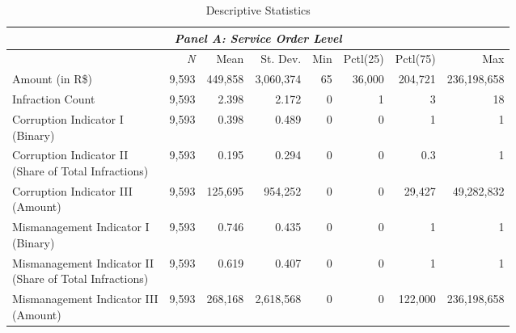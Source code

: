 
\begin{table}[!htbp]
  \caption{\label{tab:descriptivestatistics}Descriptive Statistics}
  \centering
  \scriptsize
  \begin{tabular}{lrrrrrrr}
  \hline

  \hline
  \multicolumn{8}{c}{\emph{Panel A: Service Order Level}} \T \B \\
  \hline
  & \multicolumn{1}{r}{\emph{N}} & \multicolumn{1}{r}{Mean} & \multicolumn{1}{r}{St. Dev.} & \multicolumn{1}{r}{Min} & \multicolumn{1}{r}{Pctl(25)} & \multicolumn{1}{r}{Pctl(75)} & \multicolumn{1}{r}{Max} \T \B \\
  \hline
  \makecell[cl]{Amount \\ \footnotesize{(in R\$)}}                                        & 9,593 & 449,858 & 3,060,374 & 65 & 36,000 & 204,721 & 236,198,658 \T \B \\
  Infraction Count                                                                        & 9,593 & 2.398   & 2.172     & 0  & 1      & 3       & 18          \T \B \\
  \makecell[cl]{Corruption Indicator I \\ {\footnotesize(Binary)}}                        & 9,593 & 0.398   & 0.489     & 0  & 0      & 1       & 1           \T \B \\
  \makecell[cl]{Corruption Indicator II \\ {\footnotesize(Share of Total Infractions)}}   & 9,593 & 0.195   & 0.294     & 0  & 0      & 0.3     & 1           \T \B \\
  \makecell[cl]{Corruption Indicator III \\ {\footnotesize(Amount)}}                      & 9,593 & 125,695 & 954,252   & 0  & 0      & 29,427  & 49,282,832  \T \B \\
  \makecell[cl]{Mismanagement Indicator I \\ {\footnotesize(Binary)}}                     & 9,593 & 0.746   & 0.435     & 0  & 0      & 1       & 1           \T \B \\
  \makecell[cl]{Mismanagement Indicator II \\ {\footnotesize(Share of Total Infractions)}}& 9,593 & 0.619   & 0.407     & 0  & 0      & 1       & 1           \T \B \\
  \makecell[cl]{Mismanagement Indicator III \\ {\footnotesize(Amount)}}                   & 9,593 & 268,168 & 2,618,568 & 0  & 0      & 122,000 & 236,198,658 \T \B \\
  \hline

\end{tabular}
\end{table}
